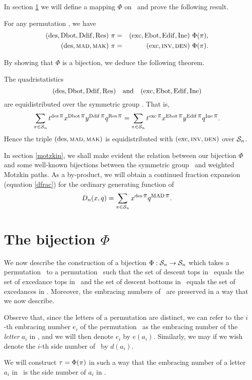 In section \ref{bijperm} we will define a mapping $\Phi$ on \sn\ and
prove the following result.
\begin{prop}\label{phistat}
For any permutation \p, we have
\begin{eqnarray*}
(\des,\dbot,\ddiff,\res)\ \pi&=&(\exc,\ebot,\ediff,\ine)\ \Phi(\pi),\\
(\des,\mad,\mak)\ \pi&=&(\exc,\inv,\den)\ \Phi(\pi).
\end{eqnarray*}
\end{prop}
By showing that $\Phi$ is a bijection, we deduce the following theorem.
\begin{thm}\label{masterperm}
The quadristatistics
$$(\mathop{\rm des}, \mathop{\rm Dbot}\nolimits, \mathop{\rm Ddif}\nolimits, \mathop{\rm Res})\quad\mbox{and}\quad
(\mathop{\rm exc}, \mathop{\rm Ebot},\mathop{\rm Edif}, \mathop{\rm Ine})$$
are equidistributed over the symmetric group \sn. That is,
$$\sum_{\pi\in{\cal S}_n}{t^{\mathop{\rm des}\mbox{$\pi$}}x^{\mathop{\rm Dbot}\nolimits\mbox{$\pi$}}y^{\mathop{\rm Ddif}\nolimits\mbox{$\pi$}}q^{\mathop{\rm Res}\mbox{$\pi$}}}
=\sum_{\pi\in{\cal S}_n}{t^{\mathop{\rm exc}\mbox{$\pi$}}x^{\mathop{\rm Ebot}\mbox{$\pi$}}y^{\mathop{\rm Edif}\mbox{$\pi$}}q^{\mathop{\rm Ine}\mbox{$\pi$}}}.$$
Hence the triple $(\mathop{\rm des}, \mathop{\mbox{\sc mad}}\nolimits, \mathop{\mbox{\sc mak}}\nolimits)$ is equidistributed with $(\mathop{\rm exc}, \mathop{\mbox{\sc inv}}\nolimits,
\mathop{\mbox{\sc den}}\nolimits)$ over ${\cal S}_n$.
\end{thm}

In section \ref{motzkin}, we shall make evident the relation between
our bijection $\Phi$ and some well-known bijections between the
symmetric group \sn\ and weighted Motzkin paths.  As a
by-product, we will obtain a continued fraction expansion
(equation \ref{dfrac}) for the ordinary generating function of
$$D_n(x,q)=\sum_{\pi\in{{\cal S}}_n}x^{\mathop{\rm des}\mbox{$\pi$}}q^{\mathop{\mbox{\sc mad}}\nolimits\mbox{$\pi$}}.$$

\section{The bijection $\Phi$}\label{bijperm}

We now describe the construction of a bijection $\Phi: \mbox{${\cal S}_n$} \rightarrow \mbox{${\cal S}_n$}$
which takes a permutation \p\ to a permutation \ta\ such that the set
of descent tops in \p\ equals the set of excedance tops in \ta\ and
the set of descent bottoms in \p\ equals the set of excedances in \ta.
Moreover, the embracing numbers of \p\ are preserved in a way that we
now describe.

Observe that, since the letters of a permutation are distinct, we can
refer to the $i$-th embracing number $e_i$ of the permutation \p\ as
the embracing number of the {\em letter} $a_i$ in \p, and we will then
denote $e_i$ by $e(a_i)$.  Similarly, we may if we wish denote the
$i$-th side number of \p\ by $d(a_i)$.

We will construct $\mbox{$\tau$} = \Phi(\pi)$ in such a way that the embracing
number of a letter $a_i$ in \p\ is the side number of $a_i$ in \ta.

